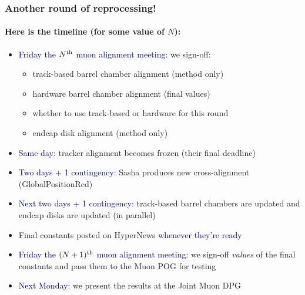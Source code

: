 \documentclass[compress]{beamer}
\newcommand{\s}[1]{{\mbox{\scriptsize #1}}}
\begin{document}
\begin{frame}
\frametitle{Another round of reprocessing!}
\framesubtitle{Here is the timeline (for some value of $N$):}
\begin{itemize}
\item \textcolor{darkblue}{Friday the $N^\s{th}$ muon alignment meeting:} we sign-off:
\begin{itemize}
\item track-based barrel chamber alignment (method only)
\item hardware barrel chamber alignment (final values)
\item whether to use track-based or hardware for this round
\item endcap disk alignment (method only)
\end{itemize}

\item \textcolor{darkblue}{Same day:} tracker alignment becomes frozen (their final deadline)

\item \textcolor{darkblue}{Two days + 1 contingency:} Sasha produces new cross-alignment (GlobalPositionRcd)

\item \textcolor{darkblue}{Next two days + 1 contingency:} track-based barrel chambers are updated and endcap disks are updated (in parallel)

\item Final constants posted on HyperNews \textcolor{darkblue}{whenever they're ready}

\item \textcolor{darkblue}{Friday the $(N+1)^\s{th}$ muon alignment
  meeting:} we sign-off {\it values} of the final constants and pass them to the Muon POG
  for testing

\item \textcolor{darkblue}{Next Monday:} we present the results at the Joint Muon DPG
\end{itemize}
\end{frame}
\end{document}
